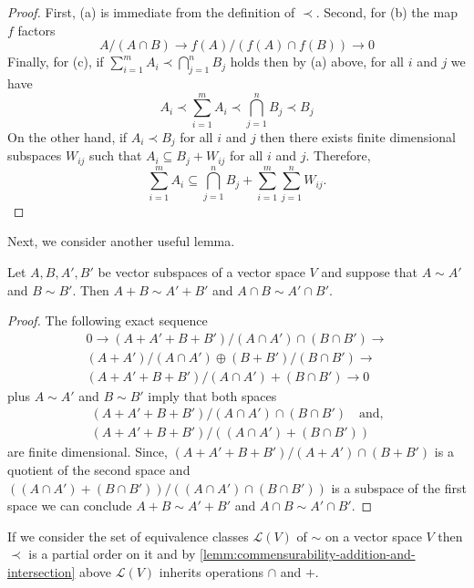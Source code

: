 \begin{proof}
	First, (a) is immediate from the definition of $\prec$. Second, for (b) the map $f$ factors
	\[
		A/(A\cap B) \to f(A)/(f(A)\cap f(B)) \to 0
	\]
	Finally, for (c), if $\sum_{i=1}^{m} A_{i} \prec \bigcap_{j=1}^{n} B_{j}$ holds then by (a) above, for all $i$ and $j$ we have
	\[
		A_{i} \prec \sum_{i=1}^{m} A_{i} \prec \bigcap_{j=1}^{n} B_{j} \prec B_{j}
	\]
	On the other hand, if $A_{i} \prec B_{j}$ for all $i$ and $j$ then there exists finite dimensional subspaces $W_{ij}$ such that $A_{i} \subseteq B_{j} + W_{ij}$ for all $i$ and $j$. Therefore,
	\[
		\sum_{i=1}^{m} A_{i} \subseteq \bigcap_{j=1}^{n} B_{j} + \sum_{i=1}^{m} \sum_{j=1}^{n} W_{ij}.
	\]

\end{proof}
Next, we consider another useful lemma.
\begin{lemma}\label{lemm:commensurability-addition-and-intersection}
	Let $A,B,A',B'$ be vector subspaces of a vector space $V$ and suppose that $A \sim A'$ and $B \sim B'$. Then $A + B \sim A' + B'$ and $A \cap B \sim A' \cap B'$.
\end{lemma}
\begin{proof}
	The following exact sequence 
	\begin{multline*}
		0 \to (A + A' + B + B')/(A\cap A')\cap(B\cap B') \to \\ (A + A')/(A \cap A') \oplus (B + B')/(B \cap B') \to \\ (A + A' + B + B')/(A\cap A') + (B\cap B') \to 0
	\end{multline*}
	plus $A \sim A'$ and $B \sim B'$ imply that both spaces
	\begin{multline*}
		(A + A' + B + B')/(A\cap A')\cap(B\cap B') \quad\text{and,}\\
		 (A + A' + B + B')/((A\cap A') + (B\cap B'))
	\end{multline*}
	are finite dimensional. Since, $(A + A' + B + B')/(A+A')\cap(B+B')$ is a quotient of the second space and $((A \cap A') + (B \cap B'))/((A\cap A')\cap(B\cap B'))$ is a subspace of the first space we can conclude $A + B \sim A' + B'$ and $A \cap B \sim A' \cap B'$.
\end{proof}
If we consider the set of equivalence classes $\mathscr{L}(V)$ of $\sim$ on a vector space $V$ then $\prec$ is a partial order on it and by \cref{lemm:commensurability-addition-and-intersection} above $\mathscr{L}(V)$ inherits operations $\cap$ and $+$.


